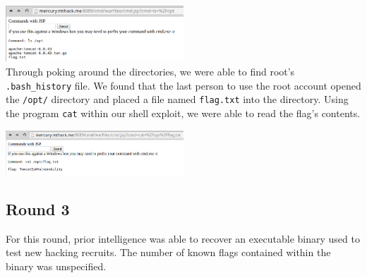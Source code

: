 \documentclass[10pt,a4paper,titlepage]{article}
\begin{document}
\includegraphics[width=0.5\textwidth]{mercury_flags/TomcatIsAVulnerability/cmd} \\
Through poking around the directories, we were able to find root's \texttt{.bash\_history} file. We found that the last person to use the root account opened the \texttt{/opt/} directory and placed a file named \texttt{flag.txt} into the directory. Using the program \texttt{cat} within our shell exploit, we were able to read the flag's contents.
\begin{center}
\includegraphics[width=0.5\textwidth]{mercury_flags/TomcatIsAVulnerability/flag}
\end{center}
\subsection{Round 3}
For this round, prior intelligence was able to recover an executable binary used to test new hacking recruits. The number of known flags contained within the binary was unspecified.
\end{document}
